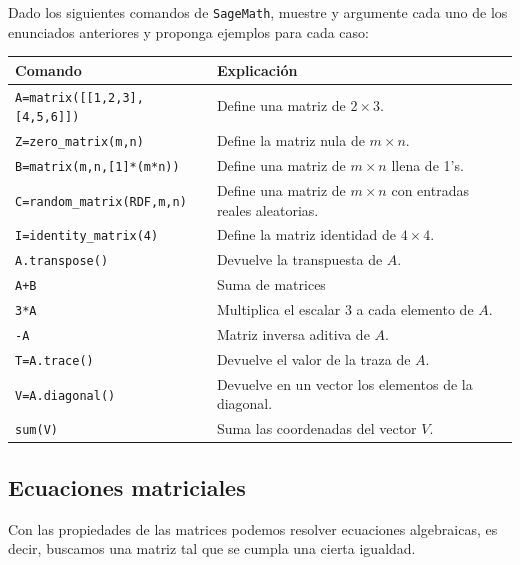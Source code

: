 \begin{ejer}
Dado los siguientes comandos de \texttt{SageMath}, muestre y argumente cada uno de los enunciados anteriores y proponga ejemplos para cada caso:
\vspace{0.5cm}
\begin{center}
\begin{tabular}{|>{\columncolor[gray]{0.8}} p{5cm}|p{10cm}|}
\hline
Comando & Explicación \\ \hline
\texttt{A=matrix([[1,2,3],[4,5,6]])}& Define una matriz de $2 \times 3$.\\ \hline
\texttt{Z=zero\_matrix(m,n)}& Define la matriz nula de $m \times n$.\\ \hline
\texttt{B=matrix(m,n,[1]*(m*n))}& Define una matriz de $m \times n$ llena de 1's.\\ \hline
\texttt{C=random\_matrix(RDF,m,n)}& Define una matriz de $m \times n$ con entradas reales aleatorias.\\ \hline
\texttt{I=identity\_matrix(4)}& Define la matriz identidad de $4 \times 4$.\\ \hline
\texttt{A.transpose()} & Devuelve la transpuesta de $A$.\\ \hline
\texttt{A+B} & Suma de matrices\\ \hline
\texttt{3*A} & Multiplica el escalar 3 a cada elemento de $A$. \\ \hline
\texttt{-A} & Matriz inversa aditiva de $A$.\\ \hline
\texttt{T=A.trace()} & Devuelve el valor de la traza de $A$.\\ \hline
\texttt{V=A.diagonal()} & Devuelve en un vector los elementos de la
diagonal.\\ \hline
\texttt{sum(V)} & Suma las coordenadas del vector $V$.\\ \hline
\end{tabular}
\end{center}
\end{ejer}
\vspace{1.5cm}

\subsection{Ecuaciones matriciales}
Con las propiedades de las matrices podemos resolver ecuaciones algebraicas, es decir, buscamos una matriz tal que se cumpla una cierta igualdad.

